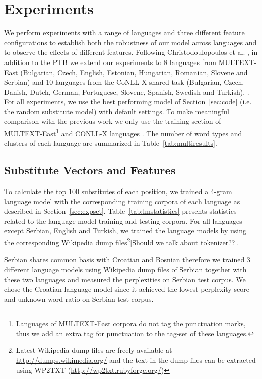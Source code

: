 \section{Experiments}
\label{sec:multilang}
\noindent We perform experiments with a range of languages and three
different feature configurations to establish both the robustness of
our model across languages and to observe the effects of different
features.  Following Christodoulopoulos et
al. , in
addition to the PTB we extend our experiments to 8 languages from
MULTEXT-East (Bulgarian, Czech, English, Estonian, Hungarian,
Romanian, Slovene and Serbian) \cite{citeulike:5820223} and 10
languages from the CoNLL-X shared task (Bulgarian, Czech, Danish,
Dutch, German, Portuguese, Slovene, Spanish, Swedish and Turkish).
\cite{Buchholz:2006:CST:1596276.1596305}.  For all experiments, we use
the best performing model of Section~\ref{sec:code} (i.e. the random
substitute model) with default settings.  To make meaningful
comparison with the previous work we only use the training section of
MULTEXT-East\footnote{Languages of MULTEXT-East corpora do not tag the
  punctuation marks, thus we add an extra tag for punctuation to the
  tag-set of these languages.} and CONLL-X languages
\cite{Lee:2010:STU:1870658.1870741}.  The number of word types and
clusters of each language are summarized in
Table~\ref{tab:multiresults}.

\subsection{Substitute Vectors and Features}

To calculate the top 100 substitutes of each position, we trained a 4-gram
language model with the corresponding training corpora of each
language as described in Section~\ref{sec:expset}.
Table~\ref{tab:lmstatistics} presents statistics related to the
language model training and testing corpora.  For all languages except
Serbian, English and Turkish, we trained the language models by using
the corresponding Wikipedia dump files\footnote{Latest Wikipedia dump
  files are freely available at \url{http://dumps.wikimedia.org/} and
  the text in the dump files can be extracted using WP2TXT
  (\url{http://wp2txt.rubyforge.org/})}[Should we talk about
  tokenizer??].

Serbian shares common basis with Croatian and Bosnian therefore we
trained 3 different language models using Wikipedia dump files of
Serbian together with these two languages and measured the
perplexities on Serbian test corpus.  We chose the Croatian language
model since it achieved the lowest perplexity score and unknown word
ratio on Serbian test corpus.

